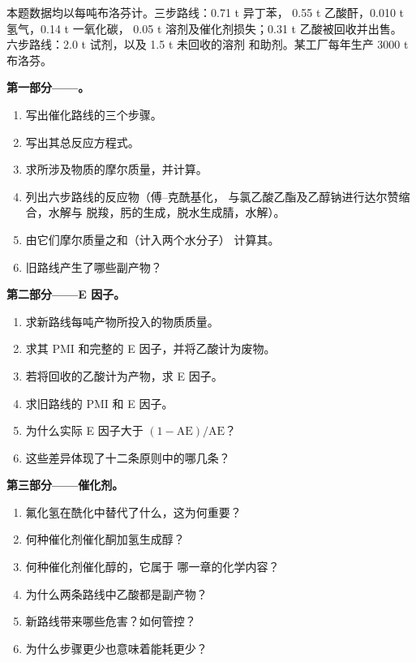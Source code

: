 \begin{problem}
\label{pb:b3:green-industrial:1}
本题数据均以每吨布洛芬计。三步路线：0.71 t 异丁苯，
0.55 t 乙酸酐，0.010 t 氢气，0.14 t 一氧化碳，
0.05 t 溶剂及催化剂损失；0.31 t 乙酸被回收并出售。
六步路线：2.0 t 试剂，以及 1.5 t 未回收的溶剂
和助剂。某工厂每年生产 3000 t 布洛芬。

\medskip\noindent\textbf{第一部分——。}
\begin{enumerate}
  \item 写出催化路线的三个步骤。
  \item 写出其总反应方程式。
  \item 求所涉及物质的摩尔质量，并计算。
  \item 列出六步路线的反应物（傅–克酰基化，
        与氯乙酸乙酯及乙醇钠进行达尔赞缩合，水解与
        脱羧，肟的生成，脱水生成腈，水解）。
  \item 由它们摩尔质量之和（计入两个水分子）
        计算其。
  \item 旧路线产生了哪些副产物？
\end{enumerate}

\medskip\noindent\textbf{第二部分——E 因子。}
\begin{enumerate}[resume]
  \item 求新路线每吨产物所投入的物质质量。
  \item 求其 PMI 和完整的 E 因子，并将乙酸计为废物。
  \item 若将回收的乙酸计为产物，求 E 因子。
  \item 求旧路线的 PMI 和 E 因子。
  \item 为什么实际 E 因子大于 $(1 - \mathrm{AE})/\mathrm{AE}$？
  \item 这些差异体现了十二条原则中的哪几条？
\end{enumerate}

\medskip\noindent\textbf{第三部分——催化剂。}
\begin{enumerate}[resume]
  \item 氟化氢在酰化中替代了什么，这为何重要？
  \item 何种催化剂催化酮加氢生成醇？
  \item 何种催化剂催化醇的，它属于
        哪一章的化学内容？
  \item 为什么两条路线中乙酸都是副产物？
  \item 新路线带来哪些危害？如何管控？
  \item 为什么步骤更少也意味着能耗更少？
\end{enumerate}


\end{problem}

